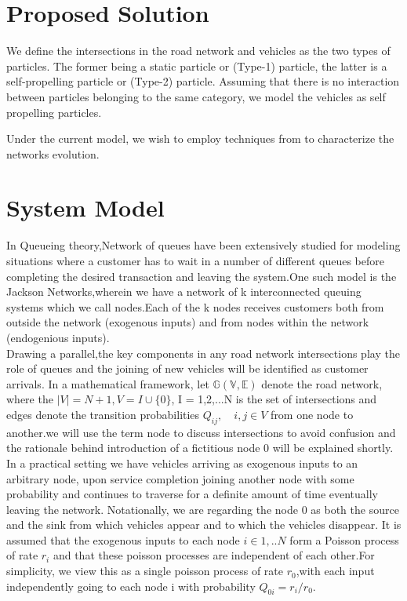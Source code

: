 \documentclass[a4paper,12pt]{scrartcl}
\begin{document}
\section*{Proposed Solution}

We define the intersections in the road network and vehicles as the two types of particles. The former being a static particle or (Type-1) particle, the latter is a self-propelling particle or (Type-2) particle. Assuming that there is no interaction between particles belonging to the same category, we model the vehicles as self propelling particles.

Under the current model, we wish to employ techniques from \cite{ChengCoRR2017} to characterize the networks evolution.      

\section*{System Model}
In Queueing theory,Network of queues have been extensively studied for modeling situations where a customer has to wait in a number of different queues before completing the desired transaction and leaving the system.One such model is the Jackson Networks,wherein we have a network of k interconnected queuing systems which we call nodes.Each of the k nodes receives customers both from outside the network (exogenous inputs) and from nodes within the network (endogenious inputs).\\ 
Drawing a parallel,the key components in any road network intersections play the role of queues and the joining of new vehicles will be identified as customer arrivals.
In a mathematical framework, let $\mathbb{G(V,E)}$ denote the road network, where the $|V|=N+1 , V = I \cup \{0\}$, I = {1,2,...N} is the set of intersections and edges denote the transition probabilities $Q_{ij},\quad i,j\in V$ from one node to another.we will use the term node to discuss intersections to avoid confusion and the rationale behind introduction of a fictitious node $0$ will be explained shortly.\\ 
In a practical setting we have vehicles arriving as exogenous inputs to an arbitrary node, upon service completion joining another node with some probability and continues to traverse for a definite amount of time eventually leaving the network. Notationally, we are regarding the node $0$ as both the source and the sink from which vehicles appear and to which the vehicles disappear.
It is assumed that the exogenous inputs to each node $i\in {1,..N}$ form a Poisson process of rate $r_i$ and that these poisson processes are independent of each other.For simplicity, we view this as a single poisson process of rate $r_0$,with each input independently going to each node i with probability $Q_{0i} = r_i/r_0$.\\
\end{document}
